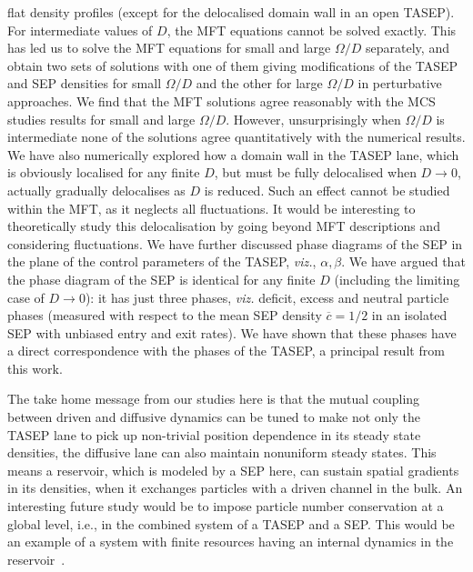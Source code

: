 \documentclass[aps,pre,twocolumn,superscriptaddress,amsmath,amssymb,longbibliography,floatfix]{revtex4}
\begin{document}
{flat density profiles (except for the delocalised domain wall in an open TASEP). For intermediate values of $D$, the MFT equations cannot be solved exactly. This has led us to solve the MFT equations for small and large $\Omega/D$ separately, and obtain two sets of solutions with one of them giving modifications of the  TASEP and SEP densities for small $\Omega/D$ and the other for large $\Omega/D$ in perturbative approaches. We find that the MFT solutions agree reasonably with the MCS studies results for small and large $\Omega/D$. However, unsurprisingly when $\Omega/D$ is intermediate none of the solutions agree quantitatively with the numerical results. We have also numerically explored how a domain wall in the TASEP lane, which is obviously localised for any finite $D$, but must be fully delocalised when $D\to 0$, actually gradually delocalises as $D$ is reduced. Such an effect cannot be studied within the MFT, as it neglects all fluctuations. It would be interesting to  theoretically  study this delocalisation by going beyond MFT descriptions and considering fluctuations. We have further discussed phase diagrams of the SEP in the plane of the control parameters of the TASEP, {\em viz.}, $\alpha,\beta$. We have argued that the phase diagram of the SEP is identical for any finite $D$ (including the limiting case of $D\rightarrow 0$): it has just three phases, {\em viz.} deficit, excess and neutral particle phases (measured with respect to the mean SEP density $\overline c=1/2$ in an isolated SEP with unbiased entry and exit rates). We have shown that these phases have a direct correspondence with the phases of the TASEP, a principal result from this work. 

The take home message from our studies here is that the mutual coupling between driven and diffusive dynamics can be tuned to make not only the TASEP lane to pick up non-trivial position dependence in its steady state densities, the diffusive lane can also maintain nonuniform steady states. This means a reservoir, which is modeled by a SEP here, can sustain spatial gradients in its densities, when it exchanges particles with a driven channel in the bulk. An interesting future study would be to impose  particle number conservation at a global level, i.e., in the combined system of a TASEP and a SEP. This would be an example of a system with finite resources having an internal dynamics in the reservoir~\cite{parna,astik-parna}. 

}
\end{document}
